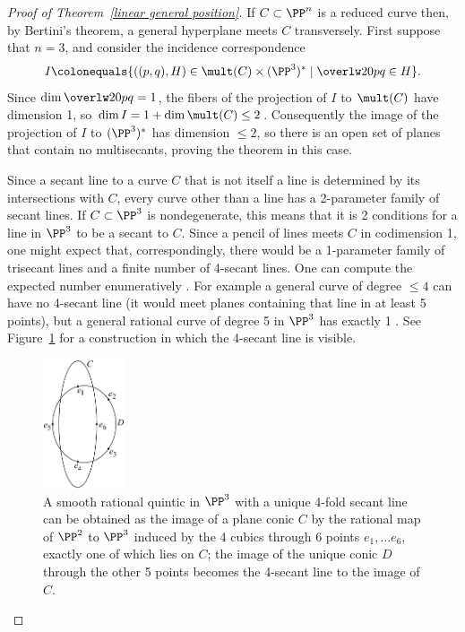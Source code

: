 \begin{proof}[Proof of Theorem~\ref{linear general position}]
If
$C\subset \PP^n$ is a reduced curve then, by Bertini's theorem, a general
%
hyperplane meets $C$ transversely.
First suppose that $n=3$, and consider the incidence correspondence
$$
I \colonequals  \{ ((p,q), H) \in \mult(C) \times (\PP^3)^* \mid
\overlw20{pq}\in H\}.
$$
Since $\dim \overlw20{pq} = 1$, the fibers of the projection of $I$
to $\mult(C)$ have dimension 1,
so $\dim I = 1+\dim \mult(C)  \leq 2$. Consequently the image of  the
projection of $I$ to $(\PP^3)^*$ has
dimension $\leq 2$, so there is an open set of planes that contain no
multisecants, proving the theorem in this case.

\begin{fact}
 Since a secant line to a curve $C$ that is not itself a line is
 determined by its intersections with $C$,
 every curve other than a line has a 2-parameter family of secant
 lines. If $C\subset \PP^3$ is nondegenerate,
 this means that it is 2 conditions for a line in $\PP^3$ to be a secant
 to $C$. Since a pencil of lines meets
 $C$ in codimension 1, one might expect that, correspondingly, there
 would be a 1-parameter family
 of trisecant lines and a finite number of 4-secant lines. One can
 compute the expected number enumeratively
 \cite[p.~296]{Griffiths-Harris1978}.
 For example a general curve of degree $\leq 4$ can have no 4-secant
 line (it would meet planes containing that line in at least 5 points),
 but a general rational curve of degree 5 in $\PP^3$
  has exactly 1 \cite[Section 12.4.4]{3264}. See  Figure~\ref{9.2}
  for a construction in which the 4-secant line is visible.

\begin{figure}[b]
\centerline {\includegraphics[height=1.5in]{"main/Fig09-2"}}
\caption{A smooth rational quintic in $\PP^{3}$ with a unique 4-fold
secant line
can be obtained as the image of a plane conic $C$ by the rational map
of $\PP^{2}$ to $\PP^{3}$
induced by the 4 cubics through 6 points $e_{1},\dots e_{6}$, exactly
one of which lies on $C$; the image of the unique conic $D$ through the
other 5 points becomes the 4-secant line to the image of $C$.
}
\label{9.2}
\end{figure}


\end{fact}
\end{proof}

